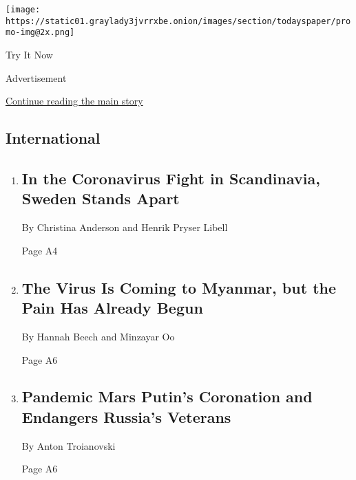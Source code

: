 \texttt{[image: https://static01.graylady3jvrrxbe.onion/images/section/todayspaper/promo-img@2x.png]}

Try It Now

Advertisement

\protect\hyperlink{after-mid1}{Continue reading the main story}

\hypertarget{international}{%
\subsection{International}\label{international}}

\begin{enumerate}
\def\labelenumi{\arabic{enumi}.}
\item
  \href{/2020/03/28/world/europe/sweden-coronavirus.html}{}

  \hypertarget{in-the-coronavirus-fight-in-scandinavia-sweden-stands-apart-1}{%
  \subsection{In the Coronavirus Fight in Scandinavia, Sweden Stands
  Apart}\label{in-the-coronavirus-fight-in-scandinavia-sweden-stands-apart-1}}

  By Christina Anderson and Henrik Pryser Libell

  Page A4
\item
  \href{/2020/03/27/world/asia/coronavirus-myanmar-jobs-china.html}{}

  \hypertarget{the-virus-is-coming-to-myanmar-but-the-pain-has-already-begun}{%
  \subsection{The Virus Is Coming to Myanmar, but the Pain Has Already
  Begun}\label{the-virus-is-coming-to-myanmar-but-the-pain-has-already-begun}}

  By Hannah Beech and Minzayar Oo

  Page A6
\item
  \href{/2020/03/28/world/europe/russia-coronavirus-putin-wwii.html}{}

  \hypertarget{pandemic-mars-putins-coronation-and-endangers-russias-veterans-1}{%
  \subsection{Pandemic Mars Putin's Coronation and Endangers Russia's
  Veterans}\label{pandemic-mars-putins-coronation-and-endangers-russias-veterans-1}}

  By Anton Troianovski

  Page A6
\end{enumerate}


